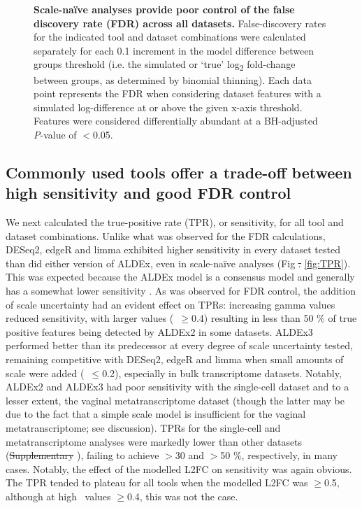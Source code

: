 \documentclass[10pt,letterpaper]{article}
\providecommand{\DIFdeltex}[1]{{\protect\color{red}\sout{#1}}}                      %
\providecommand{\DIFdelbegin}{} %
\providecommand{\DIFdelend}{} %
\providecommand{\DIFdel}[1]{\texorpdfstring{\DIFdeltex{#1}}{}} %
\newcommand{\DIFscaledelfig}{0.5}
\newlength{\DIFdelgraphicswidth} %
\newlength{\DIFdelgraphicsheight} %
\newcommand{\DIFdelincludegraphics}[2][]{%
\sbox{\DIFdelgraphicsbox}{\DIFOincludegraphics[#1]{#2}}%
\settoboxwidth{\DIFdelgraphicswidth}{\DIFdelgraphicsbox} %
\settoboxtotalheight{\DIFdelgraphicsheight}{\DIFdelgraphicsbox} %
\scalebox{\DIFscaledelfig}{%
\parbox[b]{\DIFdelgraphicswidth}{\usebox{\DIFdelgraphicsbox}\\[-\baselineskip] \rule{\DIFdelgraphicswidth}{0em}}\llap{\resizebox{\DIFdelgraphicswidth}{\DIFdelgraphicsheight}{%
\setlength{\unitlength}{\DIFdelgraphicswidth}%
\begin{picture}(1,1)%
\thicklines\linethickness{2pt} %
{\color[rgb]{1,0,0}\put(0,0){\framebox(1,1){}}}%
{\color[rgb]{1,0,0}\put(0,0){\line( 1,1){1}}}%
{\color[rgb]{1,0,0}\put(0,1){\line(1,-1){1}}}%
\end{picture}%
}\hspace*{3pt}}} %
} %
\DeclareRobustCommand{\DIFdelbegin}{\DIFOdelbegin \let\includegraphics\DIFdelincludegraphics} %
\DeclareRobustCommand{\DIFdelend}{\DIFOaddend \let\includegraphics\DIFOincludegraphics} %
\begin{document}
\begin{figure}[H]
    \centering
    \caption{\textbf{Scale-na\"ive analyses provide poor control of the false discovery rate (FDR) across all datasets.} False-discovery rates for the indicated tool and dataset combinations were calculated separately for each 0.1 increment in the model difference between groups threshold (i.e. the simulated or `true' log\textsubscript{2} fold-change between groups, as determined by binomial thinning). Each data point represents the FDR when considering dataset features with a simulated log-difference at or above the given x-axis threshold. Features were considered differentially abundant at a BH-adjusted \textit{P}-value of $<$0.05.}
    \label{fig:FDR}
\end{figure}

\subsection*{Commonly used tools offer a trade-off between high sensitivity and good FDR control}
We next calculated the true-positive rate (TPR), or sensitivity, for all tool and dataset combinations. Unlike what was observed for the FDR calculations, DESeq2, edgeR and limma exhibited higher sensitivity in every dataset tested than did either version of ALDEx, even in scale-na\"ive analyses  (Fig \DIFdelbegin \DIFdel{. }\DIFdelend \ref{fig:TPR}). This was expected because the ALDEx model is a consensus model \cite{fernandes:2014} and generally has a somewhat lower sensitivity \cite{hawinkel2017, Nearing:2022aa}. As was observed for FDR control, the addition of scale uncertainty had an evident effect on TPRs: increasing gamma values reduced sensitivity, with larger values (\textgamma~$\geq$0.4) resulting in less than 50 \% of true positive features being detected by ALDEx2 in some datasets. ALDEx3 performed better than its predecessor at every degree of scale uncertainty tested, remaining competitive with DESeq2, edgeR and limma when small amounts of scale were added (\textgamma~$\leq$0.2), especially in bulk transcriptome datasets. Notably, ALDEx2 and ALDEx3 had poor sensitivity with the single-cell dataset and to a lesser extent, the vaginal metatranscriptome dataset (though the latter may be due to the fact that a simple scale model is insufficient for the vaginal metatranscriptome; see discussion). TPRs for the single-cell and metatranscriptome analyses were markedly lower than other datasets (\DIFdelbegin \DIFdel{Supplementary }\DIFdelend {}), failing to achieve $>$30 and $>$50 \%, respectively, in many cases. Notably, the effect of the modelled L2FC on sensitivity was again obvious. The TPR tended to plateau for all tools when the modelled L2FC was $\geq$0.5, although at high \textgamma~values $\ge$0.4, this was not the case. 
\end{document}
